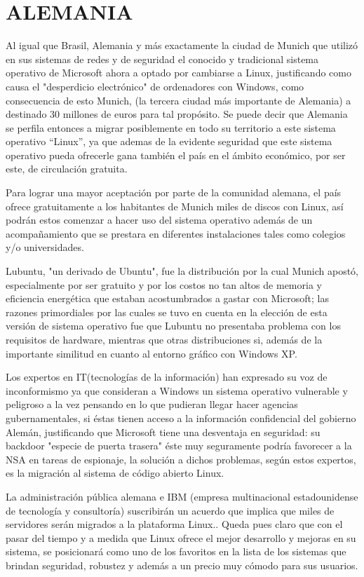 \section*{ALEMANIA}
Al igual que Brasil, Alemania y más exactamente la ciudad de Munich que utilizó en sus sistemas de redes y  de seguridad el conocido y tradicional sistema operativo de 
Microsoft ahora a optado por cambiarse a Linux, justificando como causa el "desperdicio electrónico" de ordenadores con Windows, como consecuencia de esto Munich, (la 
tercera ciudad más importante de Alemania) a destinado 30 millones de euros para tal propósito. Se puede decir que Alemania se perfila entonces a migrar posiblemente en 
todo su territorio a este sistema operativo “Linux”, ya que ademas de la evidente seguridad que este sistema operativo pueda ofrecerle gana también el país en el ámbito 
económico, por ser este, de circulación gratuita.

Para lograr una mayor aceptación por parte de la comunidad alemana, el país ofrece gratuitamente a los habitantes de Munich  miles de discos con Linux, así podrán estos 
comenzar a hacer uso del sistema operativo además de un acompañamiento que se prestara en diferentes instalaciones tales como colegios y/o universidades.

Lubuntu, "un derivado de Ubuntu", fue la distribución por la cual Munich apostó, especialmente por ser gratuito y por los costos no tan altos de memoria y eficiencia 
energética que estaban acostumbrados a gastar con Microsoft; las razones primordiales por las cuales se tuvo en cuenta en la elección de esta versión de sistema operativo 
fue que Lubuntu no presentaba problema con los requisitos de hardware, mientras que otras distribuciones si, además de la importante similitud en cuanto al entorno gráfico 
con Windows XP.

Los expertos en IT(tecnologías de la información) han expresado su voz de inconformismo ya que consideran a Windows un sistema operativo vulnerable y peligroso a la vez 
pensando en lo que pudieran llegar hacer agencias gubernamentales, si éstas tienen acceso a la información confidencial del gobierno Alemán, justificando que Microsoft 
tiene una desventaja en seguridad: su backdoor "especie de puerta trasera" éste muy seguramente podría favorecer a la NSA en tareas de espionaje, la solución a dichos 
problemas, según estos expertos, es la migración al sistema de código abierto Linux.

La administración pública alemana e IBM (empresa multinacional estadounidense de tecnología y consultoría) suscribirán un acuerdo que implica que miles de servidores serán 
migrados a la plataforma Linux.. Queda pues claro que con el pasar del tiempo y a medida que Linux ofrece el mejor desarrollo y mejoras en su sistema, se posicionará como 
uno de los favoritos en la lista de los sistemas que brindan seguridad, robustez y además a un precio muy cómodo para sus usuarios.


